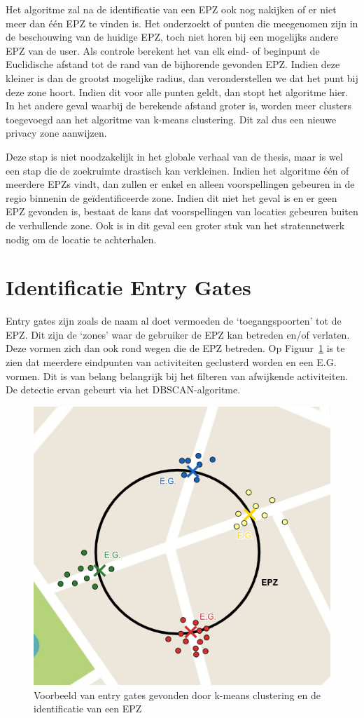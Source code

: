 Het algoritme zal na de identificatie van een \ac{EPZ} ook nog nakijken of er
niet meer dan één \ac{EPZ} te vinden is. Het onderzoekt of punten die
meegenomen zijn in de beschouwing van de huidige \ac{EPZ}, toch niet horen bij
een mogelijks andere \ac{EPZ} van de user. Als controle berekent het van elk
eind- of beginpunt de Euclidische afstand tot de rand van de bijhorende
gevonden \ac{EPZ}. Indien deze kleiner is dan de grootst mogelijke radius, dan
veronderstellen we dat het punt bij deze zone hoort. Indien dit voor alle
punten geldt, dan stopt het algoritme hier. In het andere geval waarbij de
berekende afstand groter is, worden meer clusters toegevoegd aan het algoritme
van k-means clustering. Dit zal dus een nieuwe privacy zone aanwijzen.

Deze stap is niet noodzakelijk in het globale verhaal van de thesis, maar is
wel een stap die de zoekruimte drastisch kan verkleinen. Indien het algoritme
één of meerdere \acp{EPZ} vindt, dan zullen er enkel en alleen voorspellingen
gebeuren in de regio binnenin de geïdentificeerde zone. Indien dit niet het
geval is en er geen \ac{EPZ} gevonden is, bestaat de kans dat voorspellingen
van locaties gebeuren buiten de verhullende zone. Ook is in dit geval een
groter stuk van het stratennetwerk nodig om de locatie te achterhalen.

\section{Identificatie Entry Gates}
Entry gates zijn zoals de naam al doet vermoeden de `toegangspoorten' tot de
\ac{EPZ}. Dit zijn de `zones' waar de gebruiker de \ac{EPZ} kan betreden en/of
verlaten. Deze vormen zich dan ook rond wegen die de \ac{EPZ} betreden. Op
Figuur~\ref{fig:entrygate} is te zien dat meerdere eindpunten van activiteiten
geclusterd worden en een \ac{E.G.} vormen. Dit is van belang belangrijk bij het
filteren van afwijkende activiteiten. De detectie ervan gebeurt via het
\ac{DBSCAN}-algoritme.
\begin{figure}
    \centering
    \includegraphics[width=0.5\linewidth]{fig/EPZ-mechanisme/Entry_Gate.png}
    \caption{Voorbeeld van entry gates gevonden door k-means clustering en de identificatie van een EPZ}\label{fig:entrygate}
\end{figure}

